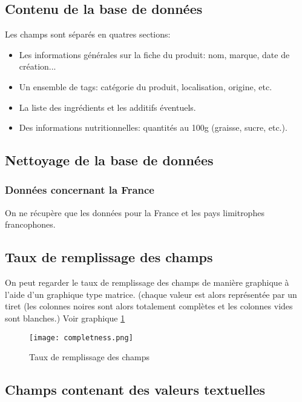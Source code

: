   \subsection{Contenu de la base de données}

  Les champs sont séparés en quatres sections:
  \begin{itemize}
    \item Les informations générales sur la fiche du produit: nom, marque, date de création...
    \item Un ensemble de tags: catégorie du produit, localisation, origine, etc.
    \item La liste des ingrédients et les additifs éventuels.
    \item Des informations nutritionnelles: quantités au 100g (graisse, sucre, etc.).
  \end{itemize}

  \subsection{Nettoyage de la base de données}

    \subsubsection{Données concernant la France}
    On ne récupère que les données pour la France et les pays limitrophes
    francophones.

    \subsection{Taux de remplissage des champs}

    On peut regarder le taux de remplissage des champs de manière graphique à
    l'aide d'un graphique type matrice. (chaque valeur est alors représentée
    par un tiret (les colonnes noires sont alors totalement complètes et les
    colonnes vides sont blanches.) Voir graphique \ref{completness}

    \begin{figure}
      \texttt{[image: completness.png]}
      \caption{Taux de remplissage des champs}
      \label{completness}
    \end{figure}
    \subsection{Champs contenant des valeurs textuelles}

